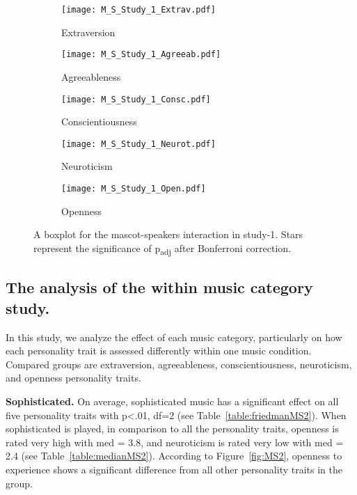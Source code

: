 \begin{figure}[hbt!]
    \centering
    \begin{subfigure}{.45\textwidth}
        \centering
        \texttt{[image: M\_S\_Study\_1\_Extrav.pdf]}
        \caption{Extraversion}
        \label{fig:sub1}
    \end{subfigure}\hfill%
    \begin{subfigure}{.45\textwidth}
        \centering
        \texttt{[image: M\_S\_Study\_1\_Agreeab.pdf]}
        \caption{Agreeableness}
        \label{fig:sub2}
    \end{subfigure}\hfill
    \begin{subfigure}{.45\textwidth}
        \centering
        \texttt{[image: M\_S\_Study\_1\_Consc.pdf]}
        \caption{Conscientiousness}
        \label{fig:sub1}
    \end{subfigure}\hfill%
    \begin{subfigure}{.45\textwidth}
        \centering
        \texttt{[image: M\_S\_Study\_1\_Neurot.pdf]}
        \caption{Neuroticism}
        \label{fig:sub1}
    \end{subfigure}\hfill%
    \begin{subfigure}{.45\textwidth}
        \centering
        \texttt{[image: M\_S\_Study\_1\_Open.pdf]}
        \caption{Openness}
        \label{fig:sub1}
    \end{subfigure}\hfill%
    \caption{A boxplot for the mascot-speakers interaction in study-1.
    Stars represent the significance of p\textsubscript{adj} after Bonferroni correction.}
    \label{fig:MS1}
\end{figure}
\subsection{The analysis of the within music category study.}
\label{subsec:MSstudy2}
In this study, we analyze the effect of each music category, particularly on how each personality
trait is assessed differently within one music condition.
Compared groups are extraversion, agreeableness, conscientiousness, neuroticism, and openness personality traits.

\par\textbf{Sophisticated.}
On average, sophisticated music has a significant effect on all five personality traits with
p<.01, df=2 (see Table~\ref{table:friedmanMS2}).
When sophisticated is played, in comparison to all the personality traits,
openness is rated very high with med = 3.8, and neuroticism
is rated very low with med = 2.4 (see Table~\ref{table:medianMS2}).
According to Figure~\ref{fig:MS2}, openness to experience shows a
significant difference from all other personality traits in the group.

